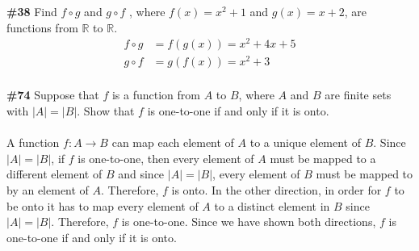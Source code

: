 \documentclass{article}
\newcommand{\problem}[1]{\textbf{\##1}}
\newcommand{\prob}[1]{\problem{#1}}
\newcommand{\AllReals}{\mathbb{R}}
\begin{document}
\prob{38} Find \(f\circ g\) and \(g \circ f\) , where \(f(x) = x^2 + 1\) and \(g(x) = x + 2\),
are functions from \(\AllReals\) to \(\AllReals\).
\begin{align*}
    f \circ g &= f(g(x))= x^2 + 4x + 5\\
    g \circ f &= g(f(x))= x^2 + 3\\
\end{align*}
\pagebreak

\prob{74} Suppose that \(f\) is a function from \(A\) to \(B\), where \(A\) and \(B\) are finite sets with \(|A| = |B|\). Show that \(f\) is one-to-one if and only if it is onto.\\\\
A function \(f: A \rightarrow B\) can map each element of \(A\) to a unique element of \(B\). Since \(|A| = |B|\), if \(f\) is one-to-one, then every element of \(A\) must be mapped to a different element of \(B\) and since \(|A| = |B|\), every element of \(B\) must be mapped to by an element of \(A\). Therefore, \(f\) is onto. In the other direction, in order for \(f\) to be onto it has to map every element of \(A\) to a distinct element in \(B\) since \(|A| = |B|\). Therefore, \(f\) is one-to-one. Since we have shown both directions, \(f\) is one-to-one if and only if it is onto.

\pagebreak
\end{document}
